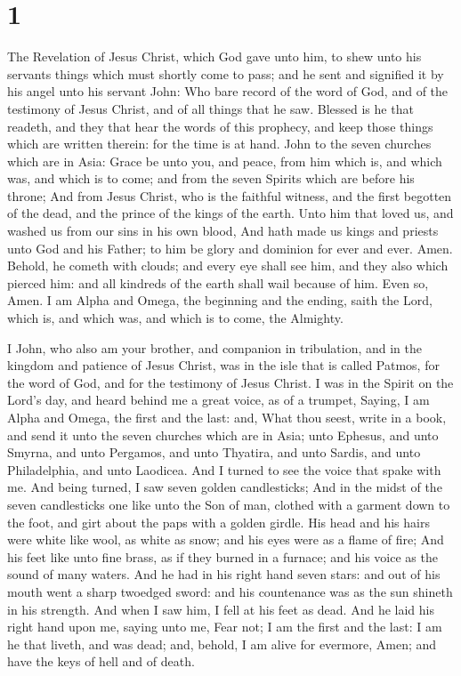 \hypertarget{section}{%
\section{1}\label{section}}

 The Revelation of Jesus Christ, which God gave unto him,
to shew unto his servants things which must shortly come to pass; and he
sent and signified it by his angel unto his servant John: 
Who bare record of the word of God, and of the testimony of Jesus
Christ, and of all things that he saw.  Blessed is he that
readeth, and they that hear the words of this prophecy, and keep those
things which are written therein: for the time is at hand.
 John to the seven churches which are in Asia: Grace be
unto you, and peace, from him which is, and which was, and which is to
come; and from the seven Spirits which are before his throne;
 And from Jesus Christ, who is the faithful witness, and
the first begotten of the dead, and the prince of the kings of the
earth. Unto him that loved us, and washed us from our sins in his own
blood,  And hath made us kings and priests unto God and
his Father; to him be glory and dominion for ever and ever. Amen.
 Behold, he cometh with clouds; and every eye shall see
him, and they also which pierced him: and all kindreds of the earth
shall wail because of him. Even so, Amen.  I am Alpha and
Omega, the beginning and the ending, saith the Lord, which is, and which
was, and which is to come, the Almighty.

 I John, who also am your brother, and companion in
tribulation, and in the kingdom and patience of Jesus Christ, was in the
isle that is called Patmos, for the word of God, and for the testimony
of Jesus Christ.  I was in the Spirit on the Lord's day,
and heard behind me a great voice, as of a trumpet, 
Saying, I am Alpha and Omega, the first and the last: and, What thou
seest, write in a book, and send it unto the seven churches which are in
Asia; unto Ephesus, and unto Smyrna, and unto Pergamos, and unto
Thyatira, and unto Sardis, and unto Philadelphia, and unto Laodicea.
 And I turned to see the voice that spake with me. And
being turned, I saw seven golden candlesticks;  And in
the midst of the seven candlesticks one like unto the Son of man,
clothed with a garment down to the foot, and girt about the paps with a
golden girdle.  His head and his hairs were white like
wool, as white as snow; and his eyes were as a flame of fire;
 And his feet like unto fine brass, as if they burned in
a furnace; and his voice as the sound of many waters. 
And he had in his right hand seven stars: and out of his mouth went a
sharp twoedged sword: and his countenance was as the sun shineth in his
strength.  And when I saw him, I fell at his feet as
dead. And he laid his right hand upon me, saying unto me, Fear not; I am
the first and the last:  I am he that liveth, and was
dead; and, behold, I am alive for evermore, Amen; and have the keys of
hell and of death.


